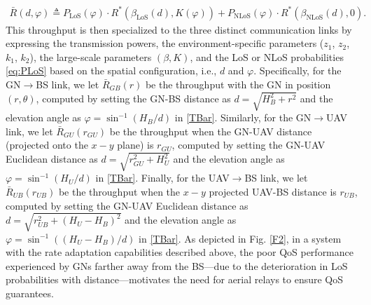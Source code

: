 \documentclass[12pt, draftcls, onecolumn]{IEEEtran}
\theoremstyle{plain}
\theoremstyle{definition}
\theoremstyle{remark}
\begin{document}
\begin{align}\label{TBar}
	\bar{R}(d,\varphi)\triangleq P_{\mathrm{LoS}}(\varphi)\cdot R^{*}(\beta_{\mathrm{LoS}}(d),K(\varphi))+P_{\mathrm{NLoS}}(\varphi)\cdot R^{*}(\beta_{\mathrm{NLoS}}(d),0).
\end{align}
This throughput is then specialized to the three distinct communication links by expressing the transmission powers, the environment-specific parameters ($z_{1}$, $z_{2}$, $k_{1}$, $k_{2}$), the large-scale parameters $(\beta,K)$, and the LoS or NLoS probabilities \eqref{eq:PLoS} based on the spatial configuration, i.e., $d$ and $\varphi$.
Specifically, for the GN$\rightarrow$BS link, we let $\bar{R}_{GB}(r)$ be the throughput with the GN in position $(r,\theta)$, computed by setting the GN-BS distance as $d{=}\sqrt{H_{B}^{2}{+}r^{2}}$ and the elevation angle as $\varphi{=}\sin^{-1}\left(H_{B}/d\right)$ in \eqref{TBar}. Similarly, for the GN$\rightarrow$UAV link, we let $\bar{R}_{GU}(r_{GU})$ be the throughput when the GN-UAV distance (projected onto the $x{-}y$ plane) is $r_{GU}$, computed by setting the GN-UAV Euclidean distance as $d{=}\sqrt{r_{GU}^{2}{+}H_{U}^{2}}$ and the elevation angle as $\varphi{=}\sin^{-1}\left(H_{U}/d\right)$ in \eqref{TBar}. Finally, for the UAV$\rightarrow$BS link, we let $\bar{R}_{UB}(r_{UB})$ be the throughput when the $x{-}y$ projected UAV-BS distance is $r_{UB}$, computed by setting the GN-UAV Euclidean distance as $d{=}\sqrt{r_{UB}^{2}{+}(H_{U}{-}H_{B})^{2}}$ and the elevation angle as $\varphi{=}\sin^{-1}\left((H_{U}{-}H_{B})/d\right)$ in \eqref{TBar}. As depicted in Fig. \ref{F2}, in a system with the rate adaptation capabilities described above, the poor QoS performance experienced by GNs farther away from the BS---due to the deterioration in LoS probabilities with distance---motivates the need for aerial relays to ensure QoS guarantees.
\end{document}
